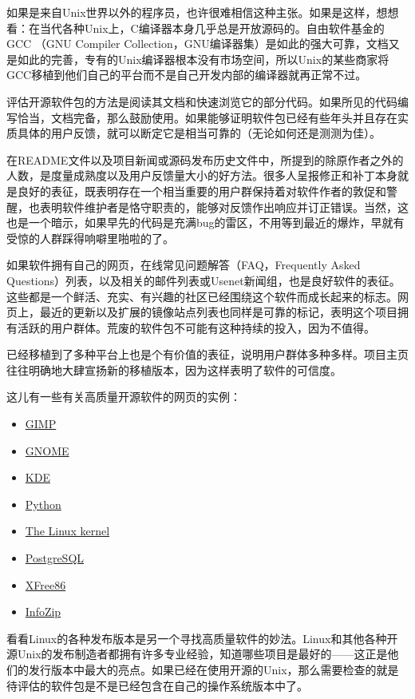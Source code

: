 \documentclass[12pt,oneside]{book}
\begin{document}
如果是来自Unix世界以外的程序员，也许很难相信这种主张。如果是这样，想想看：在当代各种Unix上，C编译器本身几乎总是开放源码的。自由软件基金的GCC （GNU Compiler Collection，GNU编译器集）是如此的强大可靠，文档又是如此的完善，专有的Unix编译器根本没有市场空间，所以Unix的某些商家将GCC移植到他们自己的平台而不是自己开发内部的编译器就再正常不过。

评估开源软件包的方法是阅读其文档和快速浏览它的部分代码。如果所见的代码编写恰当，文档完备，那么鼓励使用。如果能够证明软件包已经有些年头并且存在实质具体的用户反馈，就可以断定它是相当可靠的（无论如何还是测测为佳）。

在README文件以及项目新闻或源码发布历史文件中，所提到的除原作者之外的人数，是度量成熟度以及用户反馈量大小的好方法。很多人呈报修正和补丁本身就是良好的表征，既表明存在一个相当重要的用户群保持着对软件作者的敦促和警醒，也表明软件维护者是恪守职责的，能够对反馈作出响应并订正错误。当然，这也是一个暗示，如果早先的代码是充满bug的雷区，不用等到最近的爆炸，早就有受惊的人群踩得响噼里啪啦的了。

如果软件拥有自己的网页，在线常见问题解答（FAQ，Frequently Asked Questions）列表，以及相关的邮件列表或Usenet新闻组，也是良好软件的表征。这些都是一个鲜活、充实、有兴趣的社区已经围绕这个软件而成长起来的标志。网页上，最近的更新以及扩展的镜像站点列表也同样是可靠的标记，表明这个项目拥有活跃的用户群体。荒废的软件包不可能有这种持续的投入，因为不值得。

已经移植到了多种平台上也是个有价值的表征，说明用户群体多种多样。项目主页往往明确地大肆宣扬新的移植版本，因为这样表明了软件的可信度。

这儿有一些有关高质量开源软件的网页的实例：
\begin{itemize}
\item \href{http://www.gimp.org/}{GIMP}
\item \href{http://www.gnome.org/}{GNOME}
\item \href{http://www.kde.org/}{KDE}
\item \href{http://www.python.org/}{Python}
\item \href{http://www.kernel.org/}{The Linux kernel}
\item \href{http://www.postgresql.org/}{PostgreSQL}
\item \href{http://xfree86.org/}{XFree86}
\item \href{http://www.info-zip.org/pub/infozip/}{InfoZip}
\end{itemize}

看看Linux的各种发布版本是另一个寻找高质量软件的妙法。Linux和其他各种开源Unix的发布制造者都拥有许多专业经验，知道哪些项目是最好的——这正是他们的发行版本中最大的亮点。如果已经在使用开源的Unix，那么需要检查的就是待评估的软件包是不是已经包含在自己的操作系统版本中了。
\end{document}
